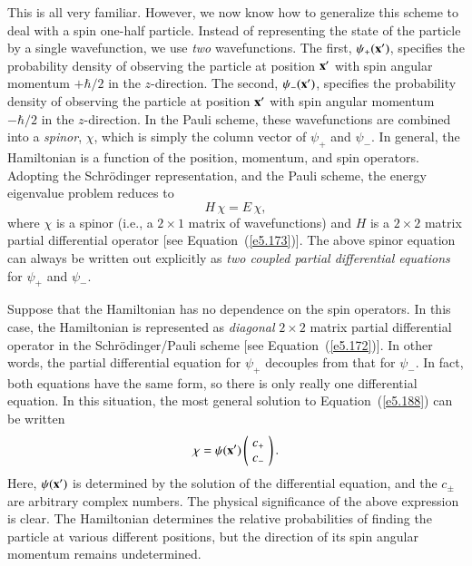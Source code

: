 This is all very familiar. However, we now know how to generalize this scheme
to  deal with  a spin one-half particle. Instead of representing the 
state of the particle by a single wavefunction, we use {\em two}\/ wavefunctions.
The first, $\psi_+({\bf x'})$, specifies the probability density of
observing the particle at position ${\bf x}'$
with spin angular momentum $+\hbar/2$ 
in the  $z$-direction. The second, $\psi_-({\bf x'})$, specifies the
 probability density of
observing the particle at position ${\bf x}'$  with spin angular momentum $-\hbar/2$ 
in the $z$-direction. In the Pauli scheme, these wavefunctions
are combined into a {\em spinor}, $\chi$, which is simply the column vector of $\psi_+$ and $\psi_-$. 
In general, the Hamiltonian is a function of the position, momentum, and spin
operators. Adopting the Schr\"{o}dinger representation, and the Pauli scheme,
the energy eigenvalue problem reduces to 
\begin{equation}\label{e5.188}
H \,\chi = E \,\chi,
\end{equation}
where $\chi$ is a spinor ({\rm i.e.}, a $2\times 1$
 matrix of wavefunctions)
 and $H$ is a $2\times 2$ matrix partial differential operator [see Equation~(\ref{e5.173})]. 
The above spinor equation can always be  written out explicitly  as {\em two
coupled partial differential equations}\/ for $\psi_+$ and $\psi_-$. 

Suppose that the Hamiltonian has no dependence on the spin operators. In this
case, the Hamiltonian is represented as {\em diagonal}\/ $2\times 2$ matrix partial
differential operator in the Schr\"{o}dinger/Pauli scheme [see Equation~(\ref{e5.172})].
In other words, the partial differential equation for $\psi_+$ decouples
from that for $\psi_-$. In fact, both equations have the same form, so there
is only really one differential equation.  In this
situation, the most general  solution to Equation~(\ref{e5.188})  can be written
\begin{equation}\label{e5.189}
\chi = \psi({\bf x}') \left(\!\begin{array}{c} c_+\\ c_-\end{array}\!\right).
\end{equation}
Here, $\psi({\bf x}')$ is determined by the solution of the differential equation,
and the $c_\pm$ are arbitrary complex numbers. The physical significance of
the above expression is clear. The Hamiltonian determines the relative probabilities
of finding the particle at various different positions, but the direction
of its spin angular momentum remains undetermined.

